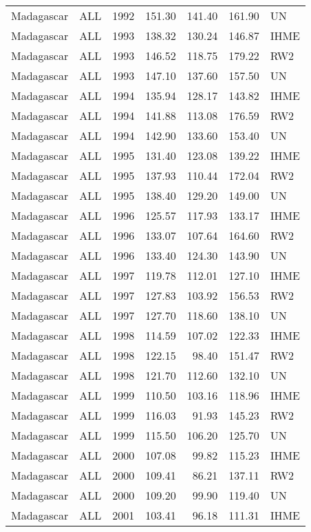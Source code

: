 \begin{longtable}{lllrrrl}
  Madagascar & ALL & 1992 & 151.30 & 141.40 & 161.90 & UN \\ 
  Madagascar & ALL & 1993 & 138.32 & 130.24 & 146.87 & IHME \\ 
  Madagascar & ALL & 1993 & 146.52 & 118.75 & 179.22 & RW2 \\ 
  Madagascar & ALL & 1993 & 147.10 & 137.60 & 157.50 & UN \\ 
  Madagascar & ALL & 1994 & 135.94 & 128.17 & 143.82 & IHME \\ 
  Madagascar & ALL & 1994 & 141.88 & 113.08 & 176.59 & RW2 \\ 
  Madagascar & ALL & 1994 & 142.90 & 133.60 & 153.40 & UN \\ 
  Madagascar & ALL & 1995 & 131.40 & 123.08 & 139.22 & IHME \\ 
  Madagascar & ALL & 1995 & 137.93 & 110.44 & 172.04 & RW2 \\ 
  Madagascar & ALL & 1995 & 138.40 & 129.20 & 149.00 & UN \\ 
  Madagascar & ALL & 1996 & 125.57 & 117.93 & 133.17 & IHME \\ 
  Madagascar & ALL & 1996 & 133.07 & 107.64 & 164.60 & RW2 \\ 
  Madagascar & ALL & 1996 & 133.40 & 124.30 & 143.90 & UN \\ 
  Madagascar & ALL & 1997 & 119.78 & 112.01 & 127.10 & IHME \\ 
  Madagascar & ALL & 1997 & 127.83 & 103.92 & 156.53 & RW2 \\ 
  Madagascar & ALL & 1997 & 127.70 & 118.60 & 138.10 & UN \\ 
  Madagascar & ALL & 1998 & 114.59 & 107.02 & 122.33 & IHME \\ 
  Madagascar & ALL & 1998 & 122.15 & 98.40 & 151.47 & RW2 \\ 
  Madagascar & ALL & 1998 & 121.70 & 112.60 & 132.10 & UN \\ 
  Madagascar & ALL & 1999 & 110.50 & 103.16 & 118.96 & IHME \\ 
  Madagascar & ALL & 1999 & 116.03 & 91.93 & 145.23 & RW2 \\ 
  Madagascar & ALL & 1999 & 115.50 & 106.20 & 125.70 & UN \\ 
  Madagascar & ALL & 2000 & 107.08 & 99.82 & 115.23 & IHME \\ 
  Madagascar & ALL & 2000 & 109.41 & 86.21 & 137.11 & RW2 \\ 
  Madagascar & ALL & 2000 & 109.20 & 99.90 & 119.40 & UN \\ 
  Madagascar & ALL & 2001 & 103.41 & 96.18 & 111.31 & IHME \\ 

\end{longtable}
